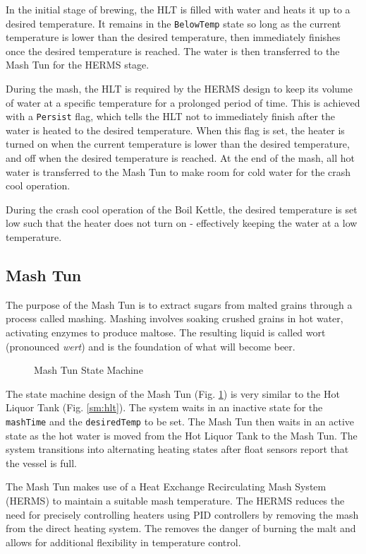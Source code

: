 \documentclass[letterpaper, 10 pt, conference]{ieeeconf}  %
\begin{document}
In the initial stage of brewing, the HLT is filled with water and heats it up to a desired temperature. It remains in the \texttt{BelowTemp} state so long as the current temperature is lower than the desired temperature, then immediately finishes once the desired temperature is reached. The water is then transferred to the Mash Tun for the HERMS stage. 

During the mash, the HLT is required by the HERMS design to keep its volume of water at a specific temperature for a prolonged period of time. This is achieved with a \texttt{Persist} flag, which tells the HLT not to immediately finish after the water is heated to the desired temperature. When this flag is set, the heater is turned on when the current temperature is lower than the desired temperature, and off when the desired temperature is reached. At the end of the mash, all hot water is transferred to the Mash Tun to make room for cold water for the crash cool operation.

During the crash cool operation of the Boil Kettle, the desired temperature is set low such that the heater does not turn on - effectively keeping the water at a low temperature.

\subsection{Mash Tun}

The purpose of the Mash Tun is to extract sugars from malted grains through a process called mashing. Mashing involves soaking crushed grains in hot water, activating enzymes to produce maltose. The resulting liquid is called wort (pronounced \textit{wert}) and is the foundation of what will become beer.

\begin{figure}[!htb]
  \centering
  
  \caption{Mash Tun State Machine}
  \label{sm:mt}
\end{figure}

The state machine design of the Mash Tun (Fig. \ref{sm:mt}) is very similar to the Hot Liquor Tank (Fig. \ref{sm:hlt}). The system waits in an inactive state for the \texttt{mashTime} and the \texttt{desiredTemp} to be set. The Mash Tun then waits in an active state as the hot water is moved from the Hot Liquor Tank to the Mash Tun. The system transitions into alternating heating states after float sensors report that the vessel is full.

The Mash Tun makes use of a Heat Exchange Recirculating Mash System (HERMS) to maintain a suitable mash temperature. The HERMS reduces the need for precisely controlling heaters using PID controllers by removing the mash from the direct heating system. The removes the danger of burning the malt and allows for additional flexibility in temperature control.
\end{document}
